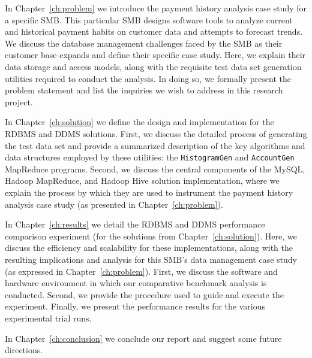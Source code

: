 In Chapter~\ref{ch:problem} we introduce the payment history analysis case study for a specific SMB. This particular SMB designs software tools to analyze current and historical payment habits on customer data and attempts to forecast trends. We discuss the database management challenges faced by the SMB as their customer base expands and define their specific case study. Here, we explain their data storage and access models, along with the requisite test data set generation utilities required to conduct the analysis. In doing so, we formally present the problem statement and list the inquiries we wish to address in this research project.

In Chapter~\ref{ch:solution} we define the design and implementation for the RDBMS and DDMS solutions. First, we discuss the detailed process of generating the test data set and provide a summarized description of the key algorithms and data structures employed by these utilities: the \texttt{HistogramGen} and \texttt{AccountGen} MapReduce programs. Second, we discuss the central components of the MySQL, Hadoop MapReduce, and Hadoop Hive solution implementation, where we explain the process by which they are used to instrument the payment history analysis case study (as presented in Chapter~\ref{ch:problem}).

In Chapter~\ref{ch:results} we detail the RDBMS and DDMS performance comparison experiment (for the solutions from Chapter~\ref{ch:solution}). Here, we discuss the efficiency and scalability for these implementations, along with the resulting implications and analysis for this SMB's data management case study (as expressed in Chapter~\ref{ch:problem}). First, we discuss the software and hardware environment in which our comparative benchmark analysis is conducted. Second, we provide the procedure used to guide and execute the experiment. Finally, we present the performance results for the various experimental trial runs.

In Chapter~\ref{ch:conclusion} we conclude our report and suggest some future directions.